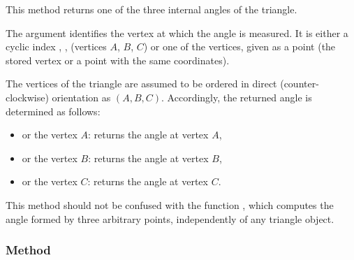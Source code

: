 This method returns one of the three internal angles of the triangle.

\medskip

The argument  identifies the vertex at which the angle is measured.
It is either a cyclic index , ,  (vertices $A$, $B$, $C$)
or one of the vertices, given as a point (the stored vertex or a point with
the same coordinates).

\medskip

The vertices of the triangle are assumed to be ordered in direct
(counter-clockwise) orientation as $(A, B, C)$.
Accordingly, the returned angle is determined as follows:

\begin{itemize}
  \item {} or the vertex $A$: returns the angle at vertex $A$,
  \item {} or the vertex $B$: returns the angle at vertex $B$,
  \item {} or the vertex $C$: returns the angle at vertex $C$.
\end{itemize}

\medskip

This method should not be confused with the function
, which computes the angle formed by three
arbitrary points, independently of any triangle object.

\vspace{1em}


\begin{tkzexample}[latex=7cm]
\begin{center}
\end{center}
\end{tkzexample}

\subsubsection{Method }
\label{ssub:method_triangle_angle}

